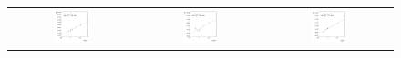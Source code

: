 \begin{figure}[ht]
  \centering
  \begin{tabular}{ccc}
    \includegraphics[width=0.3\textwidth]{figures/ResFit_Spring10QCDFlat_Gauss_Eta0_ExtrapolatedPar0_PtBin1} &
    \includegraphics[width=0.3\textwidth]{figures/ResFit_Spring10QCDFlat_Gauss_Eta0_ExtrapolatedPar0_PtBin2} &
    \includegraphics[width=0.3\textwidth]{figures/ResFit_Spring10QCDFlat_Gauss_Eta0_ExtrapolatedPar0_PtBin3} \\


\end{tabular}
\end{figure}
